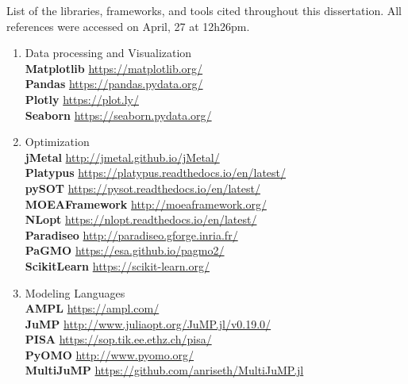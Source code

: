 List of the libraries, frameworks, and tools cited throughout this dissertation. All references were accessed on April, 27 at 12h26pm.

\begin{enumerate}[label=\Alph*]
\item Data processing and Visualization \\
\textbf{Matplotlib} \url{https://matplotlib.org/} \\
\textbf{Pandas} \url{https://pandas.pydata.org/} \\
\textbf{Plotly} \url{https://plot.ly/} \\
\textbf{Seaborn} \url{https://seaborn.pydata.org/}

\item Optimization \\
\textbf{jMetal} \url{http://jmetal.github.io/jMetal/} \\
\textbf{Platypus} \url{https://platypus.readthedocs.io/en/latest/} \\
\textbf{pySOT} \url{https://pysot.readthedocs.io/en/latest/} \\
\textbf{MOEAFramework} \url{http://moeaframework.org/} \\
\textbf{NLopt} \url{https://nlopt.readthedocs.io/en/latest/} \\
\textbf{Paradiseo} \url{http://paradiseo.gforge.inria.fr/} \\
\textbf{PaGMO} \url{https://esa.github.io/pagmo2/} \\
\textbf{ScikitLearn} \url{https://scikit-learn.org/} 


\item Modeling Languages  \\
\textbf{AMPL} \url{https://ampl.com/} \\
\textbf{JuMP} \url{http://www.juliaopt.org/JuMP.jl/v0.19.0/} \\
\textbf{PISA} \url{https://sop.tik.ee.ethz.ch/pisa/} \\
\textbf{PyOMO} \url{http://www.pyomo.org/} \\
\textbf{MultiJuMP} \url{https://github.com/anriseth/MultiJuMP.jl}


\end{enumerate}
